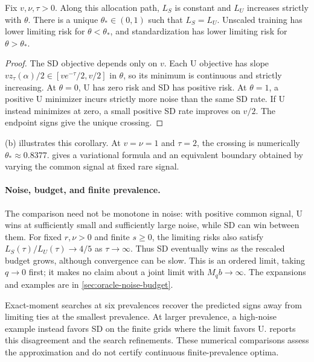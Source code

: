 \begin{corollary}
  \label{cor:oracle-allocation}
  Fix $v,\nu,\tau>0$. Along this allocation path, $L_S$ is constant and $L_U$
  increases strictly with $\theta$. There is a unique
  $\theta_*\in(0,1)$ such that $L_S=L_U$. Unscaled training has lower limiting
  risk for $\theta<\theta_*$, and standardization has lower limiting risk for
  $\theta>\theta_*$.
\end{corollary}

\begin{proof}
  The SD objective depends only on $v$. Each U objective has slope
  $vz_\tau(\alpha)/2\in[ve^{-\tau}/2,v/2]$ in $\theta$, so its minimum is
  continuous and strictly increasing. At $\theta=0$, U has zero risk and SD
  has positive risk. At $\theta=1$, a positive U minimizer incurs strictly
  more noise than the same SD rate. If U instead minimizes at zero, a small
  positive SD rate improves on $v/2$. The endpoint signs give the unique crossing.
\end{proof}

(b) illustrates this corollary. At $v=\nu=1$
and $\tau=2$, the crossing is numerically $\theta_*\approx0.8377$.
 gives a variational formula and an equivalent
boundary obtained by varying the common signal at fixed rare signal.

\paragraph{Noise, budget, and finite prevalence.}

The comparison need not be monotone in noise: with positive common signal, U
wins at sufficiently small and sufficiently large noise, while SD can win
between them. For fixed $r,\nu>0$ and finite $s\geq0$, the limiting risks
also satisfy $L_S(\tau)/L_U(\tau)\to4/5$ as $\tau\to\infty$. Thus SD
eventually wins as the rescaled budget grows, although convergence can be slow.
This is an ordered limit, taking $q\to0$ first; it makes no claim about a joint
limit with $M_qb\to\infty$. The expansions and examples are in
\cref{sec:oracle-noise-budget}.

Exact-moment searches at six prevalences recover the predicted signs away from
limiting ties at the smallest prevalence. At larger prevalence, a high-noise
example instead favors SD on the finite grids where the limit favors U.
 reports this disagreement and the search refinements.
These numerical comparisons assess the approximation and do not certify
continuous finite-prevalence optima.
